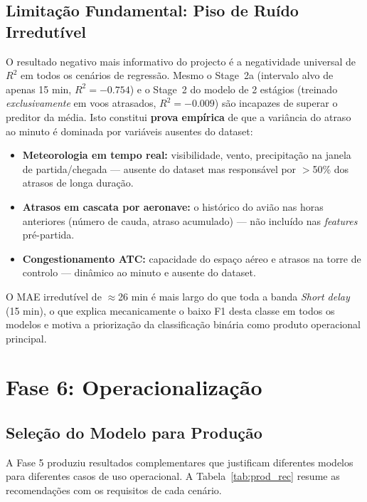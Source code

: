 \documentclass[conference]{IEEEtran}
\begin{document}
\subsection{Limitação Fundamental: Piso de Ruído Irredutível}
O resultado negativo mais informativo do projecto é a negatividade universal de
$R^2$ em todos os cenários de regressão. Mesmo o Stage~2a (intervalo alvo de
apenas 15 min, $R^2 = -0.754$) e o Stage~2 do modelo de 2 estágios (treinado
\emph{exclusivamente} em voos atrasados, $R^2 = -0.009$) são incapazes de superar
o preditor da média. Isto constitui \textbf{prova empírica} de que a variância do
atraso ao minuto é dominada por variáveis ausentes do dataset:
\begin{itemize}
\item \textbf{Meteorologia em tempo real:} visibilidade, vento, precipitação na
      janela de partida/chegada — ausente do dataset mas responsável por $>$50\%
      dos atrasos de longa duração.
\item \textbf{Atrasos em cascata por aeronave:} o histórico do avião nas horas
      anteriores (número de cauda, atraso acumulado) — não incluído nas
      \textit{features} pré-partida.
\item \textbf{Congestionamento ATC:} capacidade do espaço aéreo e atrasos na
      torre de controlo — dinâmico ao minuto e ausente do dataset.
\end{itemize}
O MAE irredutível de $\approx$26 min é mais largo do que toda a banda
\textit{Short delay} (15 min), o que explica mecanicamente o baixo F1 desta
classe em todos os modelos e motiva a priorização da classificação binária como
produto operacional principal.

\section{Fase 6: Operacionalização}

\subsection{Seleção do Modelo para Produção}
A Fase 5 produziu resultados complementares que justificam diferentes modelos
para diferentes casos de uso operacional. A Tabela~\ref{tab:prod_rec} resume as
recomendações com os requisitos de cada cenário.
\end{document}

